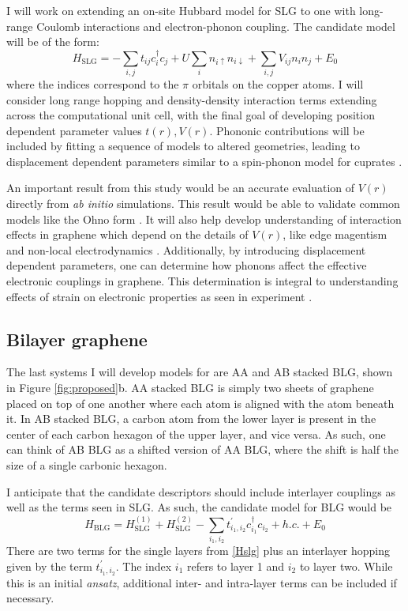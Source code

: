 \documentclass[12pt]{article}
\begin{document}
I will work on extending an on-site Hubbard model for SLG \cite{Zheng2017, Wagner2015} to one with long-range Coulomb interactions and electron-phonon coupling.
The candidate model will be of the form:
\begin{equation}
H_\text{SLG} = -\sum_{i,j} t_{ij}c_i^\dagger c_j + U \sum_i n_{i\uparrow}n_{i\downarrow}  + \sum_{i,j} V_{ij} n_i n_j + E_0
\label{Hslg}
\end{equation}
where the indices correspond to the $\pi$ orbitals on the copper atoms.
I will consider long range hopping and density-density interaction terms extending across the computational unit cell, with the final goal of developing position dependent parameter values $t(r), V(r)$.
Phononic contributions will be included by fitting a sequence of models to altered geometries, leading to displacement dependent parameters similar to a spin-phonon model for cuprates \cite{Wagner2014}.

An important result from this study would be an accurate evaluation of $V(r)$ directly from \textit{ab initio} simulations.
This result would be able to validate common models like the Ohno form \cite{Ohno1964}.
It will also help develop understanding of interaction effects in graphene which depend on the details of $V(r)$, like edge magentism \cite{PhysRevB.95.195420} and non-local electrodynamics \cite{PhysRevB.90.045137}.
Additionally, by introducing displacement dependent parameters, one can determine how phonons affect the effective electronic couplings in graphene.
This determination is integral to understanding effects of strain on electronic properties as seen in experiment \cite{Naumis_2017}.

\subsection{Bilayer graphene}
The last systems I will develop models for are AA and AB stacked BLG, shown in Figure \ref{fig:proposed}b.
AA stacked BLG is simply two sheets of graphene placed on top of one another where each atom is aligned with the atom beneath it.
In AB stacked BLG, a carbon atom from the lower layer is present in the center of each carbon hexagon of the upper layer, and vice versa.
As such, one can think of AB BLG as a shifted version of AA BLG, where the shift is half the size of a single carbonic hexagon.

I anticipate that the candidate descriptors should include interlayer couplings as well as the terms seen in SLG.
As such, the candidate model for BLG would be
\begin{equation}
H_\text{BLG} = H_\text{SLG}^{(1)} + H_\text{SLG}^{(2)} - \sum_{i_1, i_2} t_{i_1, i_2}^\prime c_{i_1}^\dagger c_{i_2} + h.c. + E_0
\label{Hblg}
\end{equation}
There are two terms for the single layers from \eqref{Hslg} plus an interlayer hopping given by the term $t_{i_1, i_2}^\prime.$  
The index $i_1$ refers to layer 1 and $i_2$ to layer two.
While this is an initial \textit{ansatz}, additional inter- and intra-layer terms can be included if necessary.
\end{document}
